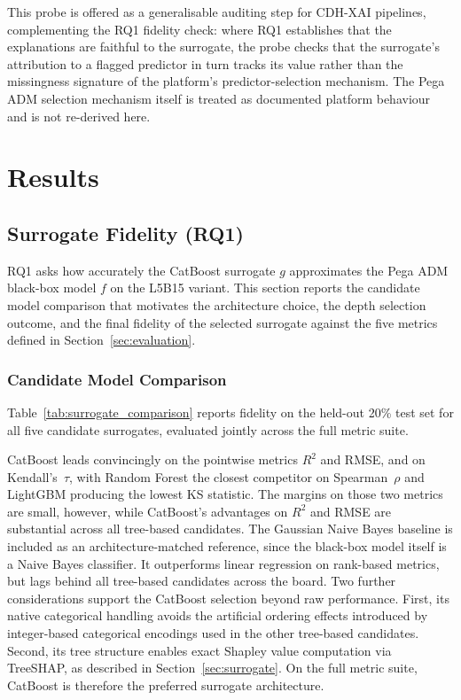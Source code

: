 \documentclass[oneside]{memoir} %
\begin{document}
This probe is offered as a generalisable auditing step for CDH-XAI pipelines, complementing the RQ1 fidelity check: where RQ1 establishes that the explanations are faithful to the surrogate, the probe checks that the surrogate's attribution to a flagged predictor in turn tracks its value rather than the missingness signature of the platform's predictor-selection mechanism. The Pega ADM selection mechanism itself is treated as documented platform behaviour and is not re-derived here.

\chapter{Results} \label{ch:results}
\section{Surrogate Fidelity (RQ1)} \label{sec:rq1}

RQ1 asks how accurately the CatBoost surrogate $g$ approximates the Pega ADM black-box model $f$ on the L5B15 variant. This section reports the candidate model comparison that motivates the architecture choice, the depth selection outcome, and the final fidelity of the selected surrogate against the five metrics defined in Section~\ref{sec:evaluation}.

\subsection{Candidate Model Comparison}

Table~\ref{tab:surrogate_comparison} reports fidelity on the held-out 20\% test set for all five candidate surrogates, evaluated jointly across the full metric suite.



CatBoost leads convincingly on the pointwise metrics $R^2$ and RMSE, and on Kendall's~$\tau$, with Random Forest the closest competitor on Spearman~$\rho$ and LightGBM producing the lowest KS statistic. The margins on those two metrics are small, however, while CatBoost's advantages on $R^2$ and RMSE are substantial across all tree-based candidates. The Gaussian Naive Bayes baseline is included as an architecture-matched reference, since the black-box model itself is a Naive Bayes classifier. It outperforms linear regression on rank-based metrics, but lags behind all tree-based candidates across the board. Two further considerations support the CatBoost selection beyond raw performance. First, its native categorical handling avoids the artificial ordering effects introduced by integer-based categorical encodings used in the other tree-based candidates. Second, its tree structure enables exact Shapley value computation via TreeSHAP, as described in Section~\ref{sec:surrogate}. On the full metric suite, CatBoost is therefore the preferred surrogate architecture.
\end{document}
